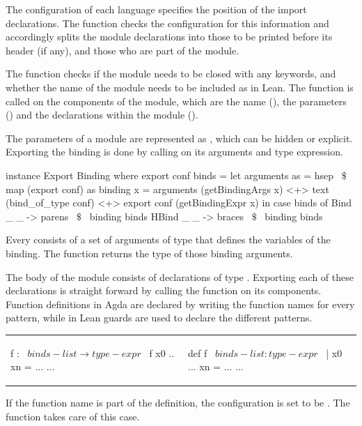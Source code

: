 The configuration of each language specifies the position of the import declarations. The function  checks the configuration for this information and accordingly splits the module declarations into those to be printed before its header (if any), and those who are part of the module. 

The   function checks if the module needs to be closed with any keywords, and whether the name of the module needs to be included as in Lean. The  function is called on the components of the module, which are the name (), the parameters () and the declarations within the module (). 

The parameters of a module are represented as \lstmath{[Binding]}, which can be hidden or explicit. Exporting the binding is done by calling  on its arguments and type expression.  
\begin{hscode}
instance Export Binding where
  export conf binds =
    let arguments as = hsep ~$\$$~ map (export conf) as
        binding x =  
          arguments (getBindingArgs x) <+> text (bind_of_type conf) 
          <+> export conf (getBindingExpr x)
    in case binds of
      Bind  _ _ -> parens ~$\$$~ binding binds
      HBind _ _ -> braces ~$\$$~ binding binds

\end{hscode}
Every  consists of a set of arguments of type  that defines the variables of the binding. The function  returns the type of those binding arguments. 

The body of the module consists of declarations of type \lstmath{[Decl]}. Exporting each of these declarations is straight forward by calling the  function on its components. Function definitions in Agda are declared by writing the function names for every pattern, while in Lean guards are used to declare the different patterns. 
\newline
\begin{tabular}{p{18em} p{10em}}
\begin{agdacode} 
f : ~$binds-list \to type-expr$~   
f x0 .. xn = ... 
...    
\end{agdacode}  
&
\begin{leancode}
def f ~$binds-list : type-expr$~ 
| x0 ... xn = ... 
... 
\end{leancode}
\end{tabular}
\newline
If the function name is part of the definition, the configuration is set to be . The function  takes care of this case. 

